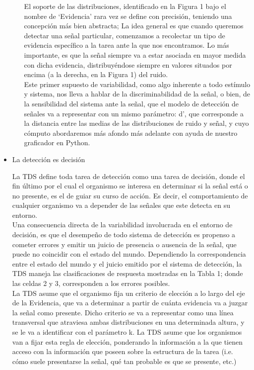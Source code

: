 \begin{itemize}
\begin{itemize}
El soporte de las distribuciones, identificado en la Figura 1 bajo el nombre de ‘Evidencia’ rara vez se define con precisión,  teniendo una concepción más bien abstracta; La idea general es que cuando queremos detectar una señal particular, comenzamos a recolectar un tipo de evidencia específico a la tarea ante la que nos encontramos. Lo más importante, es que la señal siempre va a estar asociada en mayor medida con dicha evidencia, distribuyéndose siempre en valores situados por encima (a la derecha, en la Figura 1) del ruido.\\


Este primer supuesto de variabilidad, como algo inherente a todo estímulo y sistema, nos lleva a hablar de la discriminabilidad de la señal, o bien, de la sensibilidad del sistema ante la señal, que el modelo de detección de señales va a representar con un mismo parámetro: d’, que corresponde a la distancia entre las medias de las distribuciones de ruido y señal, y cuyo cómputo abordaremos más afondo más adelante con ayuda de nuestro graficador en Python.\\ 

     \end{itemize}
  \item{La detección es decisión}

La TDS define toda tarea de detección como una tarea de decisión, donde el fin último por el cual el organismo se interesa en determinar si la señal está o no presente, es el de guiar su curso de acción. Es decir, el comportamiento de cualquier organismo va a depender de las señales que este detecta en su entorno.\\
Una consecuencia directa de la variabilidad involucrada en el entorno de decisión, es que el desempeño de todo sistema de detección es propenso a cometer errores y emitir un juicio de presencia o ausencia de la señal, que puede no coincidir con el estado del mundo. Dependiendo la correspondencia entre el estado del mundo y el juicio emitido por el sistema de detección, la TDS maneja las clasificaciones de respuesta mostradas en la Tabla 1; donde las celdas 2 y 3, corresponden a los errores posibles.\\

La TDS asume que el organismo fija un criterio de elección a lo largo del eje de la Evidencia, que va a determinar a partir de cuánta evidencia va a juzgar la señal como presente. Dicho criterio se va a representar como una línea transversal que atraviesa ambas distribuciones en una determinada altura, y se le va a identificar con el parámetro k. La TDS asume que los organismos van a fijar esta regla de elección, ponderando la información a la que tienen acceso con la información que poseen sobre la estructura de la tarea (i.e. cómo suele presentarse la señal, qué tan probable es que se presente, etc.)\\


\end{itemize}
